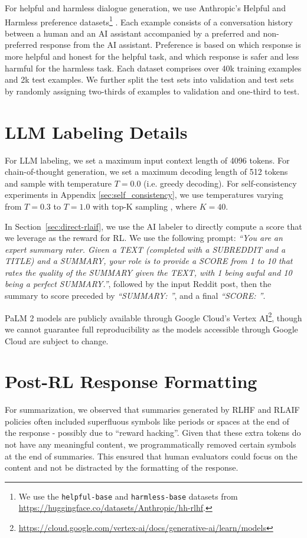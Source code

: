 \documentclass[11pt]{article}
\begin{document}
For helpful and harmless dialogue generation, we use Anthropic's Helpful and Harmless preference datasets\footnote{We use the \texttt{helpful-base} and \texttt{harmless-base} datasets from \url{https://huggingface.co/datasets/Anthropic/hh-rlhf}.} \citep{bai2022training}. Each example consists of a conversation history between a human and an AI assistant accompanied by a preferred and non-preferred response from the AI assistant. Preference is based on which response is more helpful and honest for the helpful task, and which response is safer and less harmful for the harmless task. Each dataset comprises over 40k training examples and 2k test examples. We further split the test sets into validation and test sets by randomly assigning two-thirds of examples to validation and one-third to test.

\section{LLM Labeling Details}
\label{sec:llm_labeling_details}
For LLM labeling, we set a maximum input context length of 4096 tokens. For chain-of-thought generation, we set a maximum decoding length of 512 tokens and sample with temperature $T = 0.0$ (i.e. greedy decoding). For self-consistency experiments in Appendix \ref{sec:self_consistency}, we use temperatures varying from $T = 0.3$ to $T = 1.0$ with top-K sampling \citep{fan-etal-2018-hierarchical}, where $K = 40$.

In Section~\ref{sec:direct-rlaif}, we use the AI labeler to directly compute a score that we leverage as the reward for RL. We use the following prompt: \textit{``You are an expert summary rater. Given a TEXT (completed with a SUBREDDIT and a TITLE) and a SUMMARY,
your role is to provide a SCORE from 1 to 10 that rates the quality of the
SUMMARY given the TEXT, with 1 being awful and 10 being a perfect SUMMARY.''}, followed by the input Reddit post, then the summary to score preceded by \textit{``SUMMARY: ''}, and a final \textit{``SCORE: ''}. 

PaLM 2 models are publicly available through Google Cloud's Vertex AI\footnote{\url{https://cloud.google.com/vertex-ai/docs/generative-ai/learn/models}}, though we cannot guarantee full reproducibility as the models accessible through Google Cloud are subject to change.


\section{Post-RL Response Formatting}
\label{sec:post_process}
For summarization, we observed that summaries generated by RLHF and RLAIF policies often included superfluous symbols like periods or spaces at the end of the response - possibly due to ``reward hacking''. Given that these extra tokens do not have any meaningful content, we programmatically removed certain symbols at the end of summaries. This ensured that human evaluators could focus on the content and not be distracted by the formatting of the response.
\end{document}
